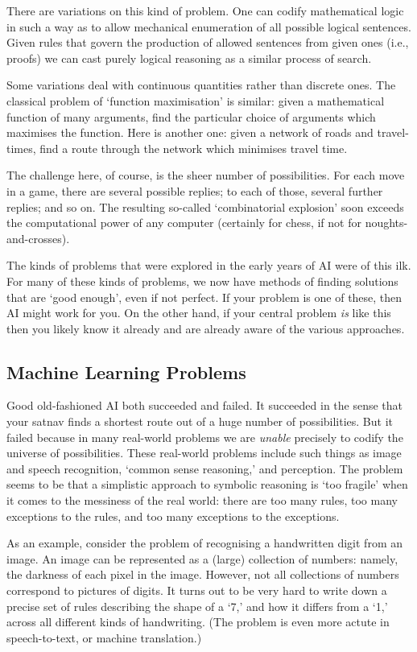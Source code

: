 \documentclass[10pt, a4, twocolumn]{article}
\newcommand{\ie}{i.e.\relax}
\begin{document}
There are variations on this kind of problem. One can codify mathematical logic
in such a way as to allow mechanical enumeration of all possible logical
sentences. Given rules that govern the production of allowed sentences from
given ones (\ie, proofs) we can cast purely logical reasoning as a similar
process of search.

Some variations deal with continuous quantities rather than discrete ones. The
classical problem of `function maximisation' is similar: given a mathematical
function of many arguments, find the particular choice of arguments which
maximises the function. Here is another one: given a network of roads and
travel-times, find a route through the network which minimises travel time.

The challenge here, of course, is the sheer number of possibilities. For each
move in a game, there are several possible replies; to each of those, several
further replies; and so on. The resulting so-called `combinatorial explosion'
soon exceeds the computational power of any computer (certainly for chess, if
not for noughts-and-crosses).

The kinds of problems that were explored in the early years of AI were of this
ilk. For many of these kinds of problems, we now have methods of finding
solutions that are `good enough', even if not perfect. If your problem is one of
these, then AI might work for you. On the other hand, if your central problem
\emph{is} like this then you likely know it already and are already aware of the
various approaches. 

\subsection{Machine Learning Problems}

Good old-fashioned AI both succeeded and failed. It succeeded in the sense that
your satnav finds a shortest route out of a huge number of possibilities. But it
failed because in many real-world problems we are \emph{unable} precisely to
codify the universe of possibilities. These real-world problems include such
things as image and speech recognition, `common sense reasoning,' and
perception. The problem seems to be that a simplistic approach to symbolic
reasoning is `too fragile' when it comes to the messiness of the real world:
there are too many rules, too many exceptions to the rules, and too many
exceptions to the exceptions.

As an example, consider the problem of recognising a handwritten digit from an
image. An image can be represented as a (large) collection of numbers: namely,
the darkness of each pixel in the image. However, not all collections of numbers
correspond to pictures of digits. It turns out to be very hard to write down a
precise set of rules describing the shape of a `7,' and how it differs from a
`1,' across all different kinds of handwriting. (The problem is even more actute
in speech-to-text, or machine translation.)
\end{document}
